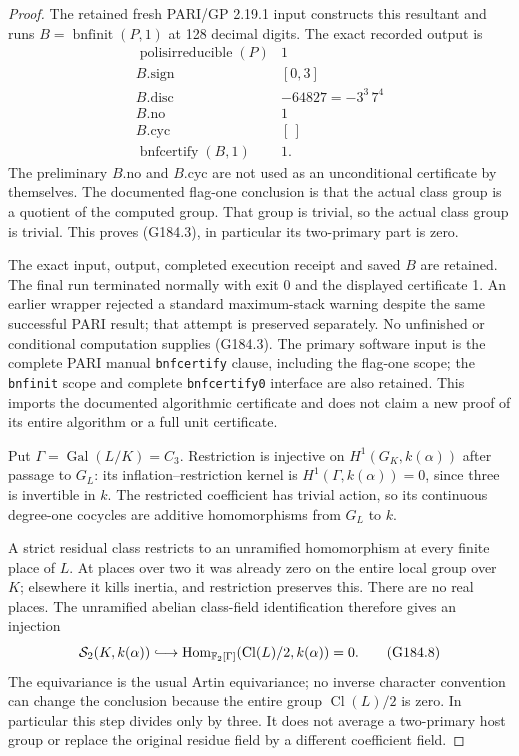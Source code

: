 \begin{proof}
The retained fresh PARI/GP 2.19.1 input constructs this resultant
and runs $B=\operatorname{bnfinit}(P,1)$ at 128 decimal digits.
The exact recorded output is
\[
 \begin{array}{c|c}
 \operatorname{polisirreducible}(P)&1\\
 B.\mathrm{sign}&[0,3]\\
 B.\mathrm{disc}&-64827=-3^3\,7^4\\
 B.\mathrm{no}&1\\
 B.\mathrm{cyc}&[\,]\\
 \operatorname{bnfcertify}(B,1)&1.
 \end{array}                                                 \tag{G184.7}
\]
The preliminary $B.\mathrm{no}$ and $B.\mathrm{cyc}$ are not used
as an unconditional certificate by themselves.
The documented flag-one conclusion is that the actual class group
is a quotient of the computed group.  That group is trivial, so
the actual class group is trivial.  This proves (G184.3), in
particular its two-primary part is zero.

The exact input, output, completed execution receipt and saved
$B$ are retained.  The final run terminated normally with exit 0
and the displayed certificate 1.  An earlier wrapper rejected a
standard maximum-stack warning despite the same successful PARI
result; that attempt is preserved separately.  No unfinished or
conditional computation supplies (G184.3).
The primary software input is the complete PARI manual
\texttt{bnfcertify} clause, including the flag-one scope; the
\texttt{bnfinit} scope and complete \texttt{bnfcertify0} interface
are also retained.  This imports the documented algorithmic
certificate and does not claim a new proof of its entire algorithm
or a full unit certificate.

Put $\Gamma=\operatorname{Gal}(L/K)=C_3$.
Restriction is injective on $H^1(G_K,k(\alpha))$ after passage to
$G_L$: its inflation--restriction kernel is
$H^1(\Gamma,k(\alpha))=0$, since three is invertible in $k$.
The restricted coefficient has trivial action, so its continuous
degree-one cocycles are additive homomorphisms from $G_L$ to $k$.

A strict residual class restricts to an unramified homomorphism at
every finite place of $L$.  At places over two it was already zero
on the entire local group over $K$; elsewhere it kills inertia,
and restriction preserves this.  There are no real places.
The unramified abelian class-field identification therefore gives
an injection
\[
 \mathcal S_2(K,k(\alpha))\lhook\joinrel\longrightarrow
 \operatorname{Hom}_{\mathbb F_2[\Gamma]}
       (\operatorname{Cl}(L)/2,k(\alpha))=0.                  \tag{G184.8}
\]
The equivariance is the usual Artin equivariance; no inverse
character convention can change the conclusion because the
entire group $\operatorname{Cl}(L)/2$ is zero.
In particular this step divides only by three.  It does not
average a two-primary host group or replace the original residue
field by a different coefficient field.


\end{proof}
